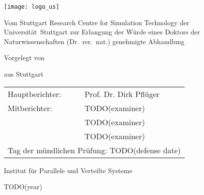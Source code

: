 
\begin{titlepage}
  \begin{spacing}{1}
    \begin{center}
      \setlength{\parindent}{0pt}
      
      \texttt{[image: logo\_us]}
      
      \vfill
      
      {\textbf{\LARGE\thetitle}\par}
      
      \vfill
      
      Vom Stuttgart Research Centre for Simulation Technology der
      Universität~Stuttgart zur Erlangung der Würde eines Doktors der
      Naturwissenschaften (Dr.~rer.~nat.) genehmigte Abhandlung
      
      \vfill
      
      Vorgelegt von
      
      \vspace{1mm}
      
      \textbf{\large\theauthor}
      
      aus Stuttgart
      
      \vfill
      
      \begin{tabular}{ll}
        Hauptberichter:&
        Prof. Dr. Dirk Pflüger\\[2mm]
        Mitberichter:&
        TODO(examiner)\\
        &TODO(examiner)\\
        &TODO(examiner)\\[5mm]
        \multicolumn{2}{l}{%
          Tag der mündlichen Prüfung:\quad
          TODO(defense date)%
        }
      \end{tabular}
      
      \vfill
      
      Institut für Parallele und Verteilte Systeme
      
      \vspace{5mm}
      
      TODO(year)
    \end{center}
  \end{spacing}
\end{titlepage}

